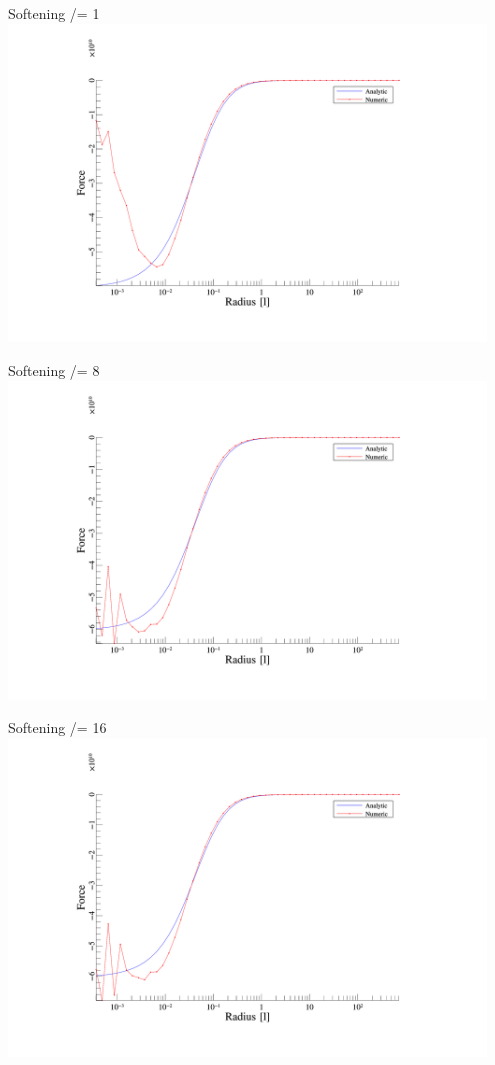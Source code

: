 \begin{frame}{Softening /= 1}
	\includegraphics[width=0.95\textwidth]{figures/plots/forces_1.png}
\end{frame}

\begin{frame}{Softening /= 8}
	\includegraphics[width=0.95\textwidth]{figures/plots/forces_8.png}
\end{frame}

\begin{frame}{Softening /= 16}
	\includegraphics[width=0.95\textwidth]{figures/plots/forces_16.png}
\end{frame}

